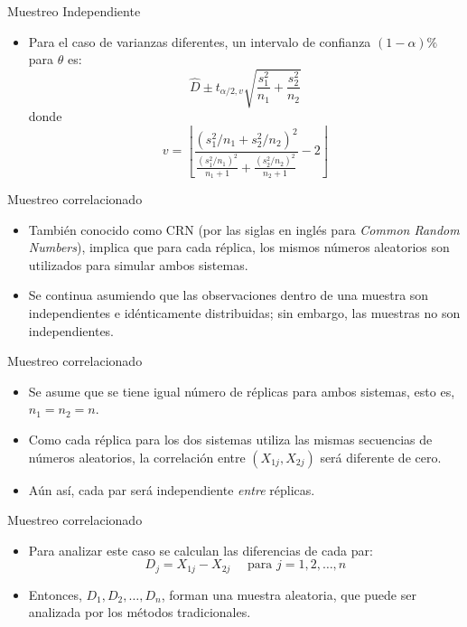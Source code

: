 \begin{frame}{Muestreo Independiente}
    \begin{itemize}
        \item Para el caso de varianzas diferentes, un intervalo de confianza $(1-\alpha)\%$ para $\theta$ es:
        \[\hat{D}\pm t_{\alpha/2,v}\sqrt{\frac{s_1^2}{n_1}+\frac{s_2^2}{n_2}}\]
        donde
        \[v=\left \lfloor{\frac{(s_1^2/n_1+s_2^2/n_2)^2}{\frac{(s_1^2/n_1)^2}{n_1+1}+\frac{(s_2^2/n_2)^2}{n_2+1}}-2}\right \rfloor\]
    \end{itemize}
\end{frame}

\begin{frame}{Muestreo correlacionado}
    \begin{itemize}
        \item También conocido como CRN (por las siglas en inglés para \textit{Common Random Numbers}), implica que para cada réplica, los mismos números aleatorios son utilizados para simular ambos sistemas.
        \item Se continua asumiendo que las observaciones dentro de una muestra son independientes e idénticamente distribuidas; sin embargo, las muestras no son independientes.
    \end{itemize}
\end{frame}

\begin{frame}{Muestreo correlacionado}
    \begin{itemize}
        \item Se asume que se tiene igual número de réplicas para ambos sistemas, esto es, $n_1=n_2=n$.
        \item Como cada réplica para los dos sistemas utiliza las mismas secuencias de números aleatorios, la correlación entre $\left(X_{1j},X_{2j}\right)$ será diferente de cero.
        \item Aún así, cada par será independiente \textit{entre} réplicas.
    \end{itemize}
\end{frame}

\begin{frame}{Muestreo correlacionado}
    \begin{itemize}
        \item Para analizar este caso se calculan las diferencias de cada par:
        \[D_j=X_{1j}-X_{2j} \quad\text{ para } j=1,2,\dots, n\]
        \item Entonces, $D_1, D_2, \dots, D_n$, forman una muestra aleatoria, que puede ser analizada por los métodos tradicionales.
    \end{itemize}
\end{frame}

